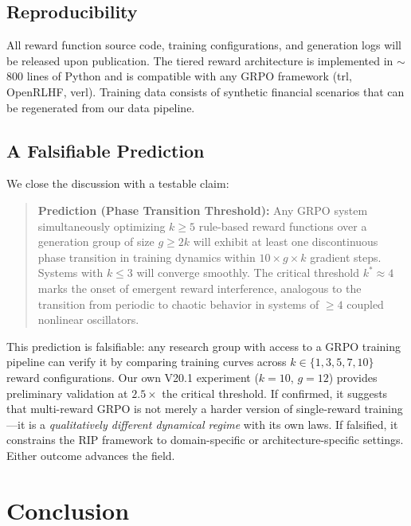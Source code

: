 \documentclass[sigconf]{acmart}
\begin{document}
\subsection{Reproducibility}

All reward function source code, training configurations, and generation logs will be released upon publication. The tiered reward architecture is implemented in $\sim$800 lines of Python and is compatible with any GRPO framework (trl, OpenRLHF, verl). Training data consists of synthetic financial scenarios that can be regenerated from our data pipeline.

\subsection{A Falsifiable Prediction}

We close the discussion with a testable claim:

\begin{quote}
\textbf{Prediction (Phase Transition Threshold):} Any GRPO system simultaneously optimizing $k \geq 5$ rule-based reward functions over a generation group of size $g \geq 2k$ will exhibit at least one discontinuous phase transition in training dynamics within $10 \times g \times k$ gradient steps. Systems with $k \leq 3$ will converge smoothly. The critical threshold $k^* \approx 4$ marks the onset of emergent reward interference, analogous to the transition from periodic to chaotic behavior in systems of $\geq 4$ coupled nonlinear oscillators.
\end{quote}

This prediction is falsifiable: any research group with access to a GRPO training pipeline can verify it by comparing training curves across $k \in \{1, 3, 5, 7, 10\}$ reward configurations. Our own V20.1 experiment ($k=10$, $g=12$) provides preliminary validation at $2.5\times$ the critical threshold. If confirmed, it suggests that multi-reward GRPO is not merely a harder version of single-reward training---it is a \textit{qualitatively different dynamical regime} with its own laws. If falsified, it constrains the RIP framework to domain-specific or architecture-specific settings. Either outcome advances the field.

\section{Conclusion}
\label{sec:conclusion}
\end{document}
